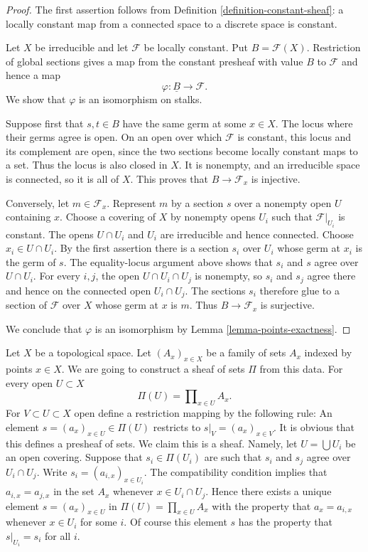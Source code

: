 \begin{proof}
The first assertion follows from Definition \ref{definition-constant-sheaf}:
a locally constant map from a connected space to a discrete space is constant.

Let $X$ be irreducible and let $\mathcal{F}$ be locally constant. Put
$B = \mathcal{F}(X)$. Restriction of global sections gives a map from the
constant presheaf with value $B$ to $\mathcal{F}$ and hence a map
$$
\varphi : \underline{B} \longrightarrow \mathcal{F}.
$$
We show that $\varphi$ is an isomorphism on stalks.

Suppose first that $s, t \in B$ have the same germ at some $x \in X$.
The locus where their germs agree is open. On an open over which
$\mathcal{F}$ is constant, this locus and its complement are open, since
the two sections become locally constant maps to a set. Thus the locus is
also closed in $X$. It is nonempty, and an irreducible space is connected,
so it is all of $X$. This proves that $B \to \mathcal{F}_x$ is injective.

Conversely, let $m \in \mathcal{F}_x$. Represent $m$ by a section $s$
over a nonempty open $U$ containing $x$. Choose a covering of $X$ by
nonempty opens $U_i$ such that $\mathcal{F}|_{U_i}$ is constant. The opens
$U \cap U_i$ and $U_i$ are irreducible and hence connected. Choose
$x_i \in U \cap U_i$. By the first assertion there is a section $s_i$
over $U_i$ whose germ at $x_i$ is the germ of $s$. The equality-locus
argument above shows that $s_i$ and $s$ agree over $U \cap U_i$.
For every $i,j$, the open $U \cap U_i \cap U_j$ is nonempty, so $s_i$
and $s_j$ agree there and hence on the connected open $U_i \cap U_j$.
The sections $s_i$ therefore glue to a section of $\mathcal{F}$ over $X$
whose germ at $x$ is $m$. Thus $B \to \mathcal{F}_x$ is surjective.

We conclude that $\varphi$ is an isomorphism by
Lemma \ref{lemma-points-exactness}.
\end{proof}

\begin{example}
\label{example-sheaf-product-pointwise}
Let $X$ be a topological space. Let $(A_x)_{x \in X}$ be
a family of sets $A_x$ indexed by points $x \in X$. We are
going to construct a sheaf of sets $\Pi$ from this data.
For every open $U \subset X$
$$
\Pi(U) = \prod\nolimits_{x \in U} A_x.
$$
For $V \subset U \subset X$ open define
a restriction mapping by the following rule: An element
$s = (a_x)_{x\in U} \in \Pi(U)$ restricts
to $s|_V = (a_x)_{x \in V}$. It is obvious that this
defines a presheaf of sets. We claim this is a sheaf.
Namely, let $U = \bigcup U_i$ be an open covering.
Suppose that $s_i \in \Pi(U_i)$ are
such that $s_i$ and $s_j$ agree over $U_i \cap U_j$. Write
$s_i = (a_{i, x})_{x\in U_i}$. The compatibility condition implies that
$a_{i, x} = a_{j, x}$ in the set $A_x$ whenever $x \in U_i \cap U_j$.
Hence there exists a unique element $s = (a_x)_{x\in U}$
in $\Pi(U) = \prod_{x\in U} A_x$ with the property that
$a_x = a_{i, x}$ whenever $x \in U_i$ for some $i$. Of course this
element $s$ has the property that $s|_{U_i} = s_i$ for all $i$.
\end{example}

